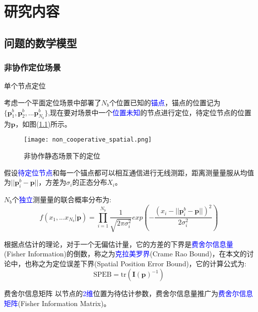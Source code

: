 \chapter{研究内容}
\label{cha:content}

\section{问题的数学模型}\label{section:model}

\subsection[非协作定位场景]{非协作定位场景}\label{subsection:noncooperative_localization}

{单个节点定位}

        考虑一个平面定位场景中部署了$N_b$个位置已知的\textcolor{blue}{锚点}，锚点的位置记为$\{\bm{p}^b_1,\bm{p}^b_2,...\bm{p}^b_{N_b}\}$,现在要对场景中一个\textcolor{blue}{位置未知}的节点进行定位，待定位节点的位置为$\bm{p}$，如图(\ref{fig:non_cooperative_spatial})所示。
        \begin{figure}
          \centering
          \texttt{[image: non\_cooperative\_spatial.png]}
          \caption{非协作静态场景下的定位}\label{fig:non_cooperative_spatial}
        \end{figure}
假设\textcolor{blue}{待定位节点}和每一个锚点都可以相互通信进行无线测距，距离测量量服从均值为$||\bm{p}^b_i-\bm{p}||$，方差为$\sigma_i$的正态分布$X_i$。

$N_b$个\textcolor{blue}{独立}测量量的联合概率分布为:
\begin{equation}\label{eq:single}
f(x_1,...x_{N_b}|\textbf{p})=\prod_{i=1}^{N_b}\frac{1}{\sqrt{2\pi\sigma_i^2}}exp(-\frac{(x_i-||\bm{p}^b_i-\bm{p}||)^2}{2\sigma_i^2})
\end{equation}

根据点估计的理论，对于一个无偏估计量，它的方差的下界是\textcolor{blue}{费舍尔信息量}(Fisher Information)的倒数，称之为\textcolor{blue}{克拉美罗界}(Crame Rao Bound)，在本文的讨论中，也称之为定位误差下界(Spatial Position Error Bound)，它的计算公式为:
\begin{equation}\label{eq:SPEB_formula}
  \text{SPEB}=\text{tr}(\bm{I(\bm{p})}^{-1})
\end{equation}


{费舍尔信息矩阵}
以节点的\textcolor{blue}{2维}位置为待估计参数，费舍尔信息量推广为\textcolor{blue}{费舍尔信息矩阵}(Fisher Information Matrix)。

